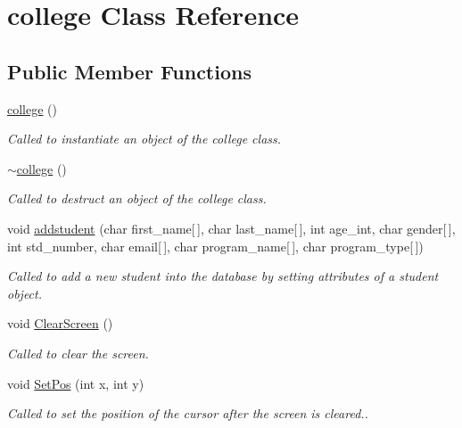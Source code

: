 \hypertarget{classcollege}{\section{college Class Reference}
\label{classcollege}
}
\subsection*{Public Member Functions}
\begin{DoxyCompactItemize}
\item 
\hyperlink{classcollege_aa91a8b9ef221b96201ef26e9b68a76ce}{college} ()
\begin{DoxyCompactList}\small\item\em Called to instantiate an object of the college class. \end{DoxyCompactList}\item 
\hyperlink{classcollege_aa3303b0384171b1234f944a4527b8feb}{$\sim$college} ()
\begin{DoxyCompactList}\small\item\em Called to destruct an object of the college class. \end{DoxyCompactList}\item 
void \hyperlink{classcollege_a7d6835463b8181286aca3a612d9d6117}{addstudent} (char first\-\_\-name\mbox{[}$\,$\mbox{]}, char last\-\_\-name\mbox{[}$\,$\mbox{]}, int age\-\_\-int, char gender\mbox{[}$\,$\mbox{]}, int std\-\_\-number, char email\mbox{[}$\,$\mbox{]}, char program\-\_\-name\mbox{[}$\,$\mbox{]}, char program\-\_\-type\mbox{[}$\,$\mbox{]})
\begin{DoxyCompactList}\small\item\em Called to add a new student into the database by setting attributes of a student object. \end{DoxyCompactList}\item 
void \hyperlink{classcollege_ad0e7e3b582c3e168aec4d6cd9d8be353}{Clear\-Screen} ()
\begin{DoxyCompactList}\small\item\em Called to clear the screen. \end{DoxyCompactList}\item 
void \hyperlink{classcollege_a19105be960895106ccfe73613608417e}{Set\-Pos} (int x, int y)
\begin{DoxyCompactList}\small\item\em Called to set the position of the cursor after the screen is cleared.. \end{DoxyCompactList}\item 

\end{DoxyCompactItemize}
